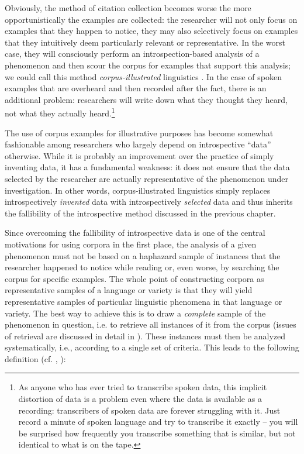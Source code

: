 Obviously, the method of citation collection becomes worse the more opportunistically the examples are collected: the researcher will not only focus on examples that they happen to notice, they may also selectively focus on examples that they intuitively  deem particularly relevant or representative.  In the worst case, they will consciously perform an introspection\hyp{}based  analysis of a phenomenon and then scour the corpus for examples that support this analysis; we could call this method \emph{corpus\hyp{}illustrated} linguistics \citep[cf.][]{tummers_usage-based_2005}. In the case of spoken  examples that are overheard and then recorded after the fact, there is an additional problem: researchers will write down what they thought they heard, not what they actually heard.{\footnote{As anyone who has ever tried to transcribe  spoken  data, this implicit distortion of data is a problem even where the data is available as a recording: transcribers of spoken data are forever struggling with it. Just record a minute of spoken language and try to transcribe it exactly -- you will be surprised how frequently you transcribe something that is similar, but not identical to what is on the tape.}}

The use of corpus examples for illustrative purposes has become somewhat fashionable among researchers who largely depend on introspective  ``data'' otherwise. While it is probably an improvement over the practice of simply inventing data, it has a fundamental weakness: it does not ensure that the data selected by the researcher are actually representative  of the phenomenon under investigation. In other words, corpus\hyp{}illustrated linguistics simply replaces introspectively \emph{invented} data with introspectively \emph{selected} data and thus inherits the fallibility of the introspective method discussed in the previous chapter.

Since overcoming the fallibility of introspective  data is one of the central motivations for using corpora in the first place, the analysis of a given phenomenon must not be based on a haphazard sample  of instances that the researcher happened to notice while reading or, even worse, by searching the corpus for specific examples. The whole point of constructing corpora as representative  samples of a language or variety  is that they will yield representative samples of particular linguistic phenomena in that language or variety. The best way to achieve this is to draw a \emph{complete} sample  of the phenomenon in question, i.e. to retrieve  all instances of it from the corpus (issues of retrieval are discussed in detail in ). These instances must then be analyzed systematically, i.e., according to a single set of criteria. This leads to the following definition (cf. \citealt[2]{biber_cambridge_2015}, \citealt[78]{cook_applied_2003}):

